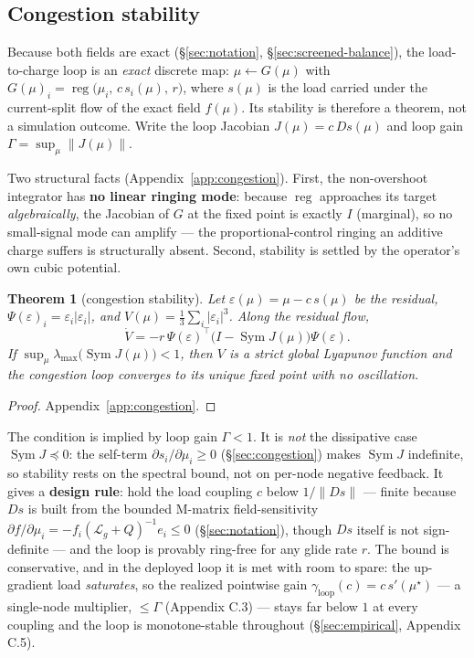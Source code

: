 \documentclass[11pt]{article}
\theoremstyle{plain}
\newtheorem{theorem}{Theorem}[section]
\numberwithin{equation}{section}
\begin{document}
\subsection{Congestion stability}\label{sec:congestion-stability}

Because both fields are exact (§\ref{sec:notation}, §\ref{sec:screened-balance}), the load-to-charge loop is an \emph{exact} discrete map: $\mu\leftarrow G(\mu)$ with $G(\mu)_i=\operatorname{reg}\!\big(\mu_i,\,c\,s_i(\mu),\,r\big)$, where $s(\mu)$ is the load carried under the current-split flow of the exact field $f(\mu)$. Its stability is therefore a theorem, not a simulation outcome. Write the loop Jacobian $J(\mu)=c\,Ds(\mu)$ and loop gain $\Gamma=\sup_\mu\|J(\mu)\|$.

Two structural facts (Appendix~\ref{app:congestion}). First, the non-overshoot integrator has \textbf{no linear ringing mode}: because $\operatorname{reg}$ approaches its target \emph{algebraically}, the Jacobian of $G$ at the fixed point is exactly $I$ (marginal), so no small-signal mode can amplify — the proportional-control ringing an additive charge suffers is structurally absent. Second, stability is settled by the operator's own cubic potential.

\begin{theorem}[congestion stability]\label{thm:congestion}
Let $\varepsilon(\mu)=\mu-c\,s(\mu)$ be the residual, $\Psi(\varepsilon)_i=\varepsilon_i|\varepsilon_i|$, and $V(\mu)=\tfrac13\sum_i|\varepsilon_i|^3$. Along the residual flow,
\[
\dot V=-r\,\Psi(\varepsilon)^{\!\top}\big(I-\operatorname{Sym}J(\mu)\big)\Psi(\varepsilon).
\]
If $\sup_\mu\lambda_{\max}\!\big(\operatorname{Sym}J(\mu)\big)<1$, then $V$ is a strict global Lyapunov function and the congestion loop converges to its unique fixed point with no oscillation.
\end{theorem}
\begin{proof}
Appendix~\ref{app:congestion}.
\end{proof}

The condition is implied by loop gain $\Gamma<1$. It is \emph{not} the dissipative case $\operatorname{Sym}J\preceq0$: the self-term $\partial s_i/\partial\mu_i\ge0$ (§\ref{sec:congestion}) makes $\operatorname{Sym}J$ indefinite, so stability rests on the spectral bound, not on per-node negative feedback. It gives a \textbf{design rule}: hold the load coupling $c$ below $1/\lVert Ds\rVert$ — finite because $Ds$ is built from the bounded M-matrix field-sensitivity $\partial f/\partial\mu_i=-f_i(\mathcal{L}_g+Q)^{-1}e_i\le 0$ (§\ref{sec:notation}), though $Ds$ itself is not sign-definite — and the loop is provably ring-free for any glide rate $r$. The bound is conservative, and in the deployed loop it is met with room to spare: the up-gradient load \emph{saturates}, so the realized pointwise gain $\gamma_{\mathrm{loop}}(c)=c\,s'(\mu^\star)$ — a single-node multiplier, $\le\Gamma$ (Appendix C.3) — stays far below $1$ at every coupling and the loop is monotone-stable throughout (§\ref{sec:empirical}, Appendix C.5).
\end{document}
